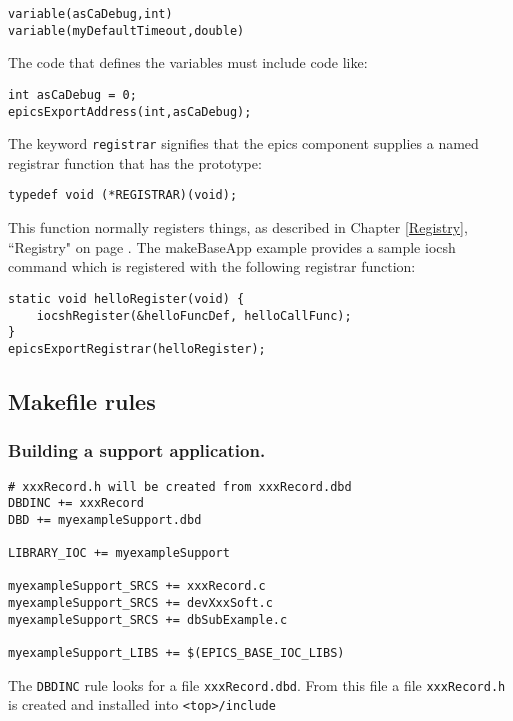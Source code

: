 \begin{verbatim}
variable(asCaDebug,int)
variable(myDefaultTimeout,double)
\end{verbatim}

The code that defines the variables must include code like:

\begin{verbatim}
int asCaDebug = 0;
epicsExportAddress(int,asCaDebug);
\end{verbatim}

The keyword \verb|registrar| signifies that the epics component supplies a named registrar function that has the prototype:

\begin{verbatim}
typedef void (*REGISTRAR)(void);
\end{verbatim}

This function normally registers things, as described in Chapter \ref{Registry}, ``Registry" on page \pageref{Registry}. The makeBaseApp example
provides a sample iocsh command which is registered with the following registrar function:

\begin{verbatim}
static void helloRegister(void) {
    iocshRegister(&helloFuncDef, helloCallFunc);
}
epicsExportRegistrar(helloRegister);
\end{verbatim}

\subsection{Makefile rules}

\subsubsection{Building a support application.}

\begin{verbatim}
# xxxRecord.h will be created from xxxRecord.dbd
DBDINC += xxxRecord
DBD += myexampleSupport.dbd

LIBRARY_IOC += myexampleSupport

myexampleSupport_SRCS += xxxRecord.c
myexampleSupport_SRCS += devXxxSoft.c
myexampleSupport_SRCS += dbSubExample.c

myexampleSupport_LIBS += $(EPICS_BASE_IOC_LIBS)
\end{verbatim}

The \verb|DBDINC| rule looks for a file \verb|xxxRecord.dbd|.
From this file a file \verb|xxxRecord.h| is created and installed into \verb|<top>/include|

